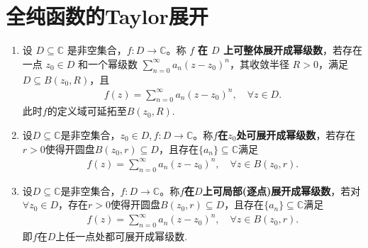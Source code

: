 \documentclass[../../main.tex]{subfiles}%
\begin{document}
\section{全纯函数的Taylor展开}

\begin{definition}
\begin{enumerate}
\item 设 $D \subseteq \mathbb{C}$ 是非空集合，$f: D \to \mathbb{C}$。称 $f$ \textbf{在 $D$ 上可整体展开成幂级数}，若存在一点 $z_0 \in D$ 和一个幂级数 $\sum_{n=0}^{\infty} a_n (z - z_0)^n$，其收敛半径 $R > 0$，满足 $D \subseteq B(z_0, R)$，且
\begin{align*}
f(z) = \sum_{n=0}^{\infty} a_n (z - z_0)^n,\quad \forall z \in D.
\end{align*}
此时$f$的定义域可延拓至$B(z_0,R)$.

\item 设$D \subseteq \mathbb{C}$是非空集合，$z_0\in D$,$\,f: D \to \mathbb{C}$。称$f$\textbf{在$z_0$处可展开成幂级数}，若存在$r > 0$使得开圆盘$B(z_0, r) \subseteq D$，且存在$\{a_n\}\subseteq \mathbb{C}$满足
\begin{align*}
f(z) = \sum\limits_{n=0}^{\infty} a_n (z - z_0)^n, \quad \forall z \in B(z_0, r).
\end{align*}

\item 设$D \subseteq \mathbb{C}$是非空集合，$f: D \to \mathbb{C}$。称$f$\textbf{在$D$上可局部(逐点)展开成幂级数}，若对$\forall z_0 \in D$，存在$r > 0$使得开圆盘$B(z_0, r) \subseteq D$，且存在$\{a_n\}\subseteq \mathbb{C}$满足
\begin{align*}
f(z) = \sum\limits_{n=0}^{\infty} a_n (z - z_0)^n, \quad \forall z \in B(z_0, r).
\end{align*}
即$f$在$D$上任一点处都可展开成幂级数.
\end{enumerate}
\end{definition}
\end{document}
